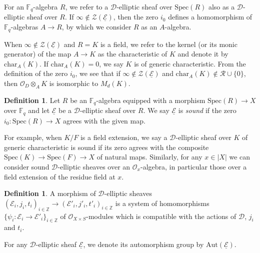 \documentclass[10pt]{amsart}
\theoremstyle{plain}
\theoremstyle{definition}
\newtheorem{dfn}[thm]{Definition}
\newcommand{\Aut}{\mathrm{Aut}}
\newcommand{\chr}{\mathrm{char}}
\newcommand{\Spec}{\mathrm{Spec}}
\newcommand{\cE}{\mathcal{E}}
\newcommand{\cO}{\mathcal{O}}
\newcommand{\cR}{\mathcal{R}}
\newcommand{\cZ}{\mathcal{Z}}
\newcommand{\ucE}{\underline{\mathcal{E}}}
\newcommand{\bF}{\mathbb{F}}
\newcommand{\bZ}{\mathbb{Z}}
\newcommand{\sD}{\mathscr{D}}
\begin{document}
For an $\bF_q$-algebra $R$, we refer to a $\sD$-elliptic sheaf over $\Spec(R)$ also as a $\sD$-elliptic sheaf over $R$. 
If $\infty\notin\cZ(\ucE)$, then the zero $i_{0}$ defines a homomorphism of $\bF_q$-algebras $A\to R$, by which we consider $R$ as an $A$-algebra. 


When $\infty\notin\cZ(\ucE)$ and $R=K$ is a field, we refer to the kernel (or its monic generator) of the map $A\to K$ as 
the characteristic of $K$ and denote it by $\chr_A(K)$. 
If $\chr_A(K)=0$, we say $K$ is of generic characteristic.
From the definition of the zero $i_{0}$, we see that if $\infty\notin\cZ(\ucE)$ and $\chr_A(K)\notin \cR\cup \{0\}$, 
then $\cO_D\otimes_A K$ is isomorphic to $M_d(K)$.


\begin{dfn}\label{DefSound}
Let $R$ be an $\bF_q$-algebra equipped with a morphism $\Spec(R)\to X$ over $\bF_q$ and let $\ucE$ be a $\sD$-elliptic sheaf over $R$.
We say $\ucE$ is \textit{sound} if the zero $i_0:\Spec(R)\to X$ agrees with the given map. 
\end{dfn}

For example, when $K/F$ is a field extension,
we say a $\sD$-elliptic sheaf over $K$ of generic characteristic is sound if its zero agrees with the composite $\Spec(K)\to \Spec(F)\to X$ of natural maps.
Similarly, for any $x\in |X|$ we can consider sound $\sD$-elliptic sheaves over an $\cO_x$-algebra, in particular those over a field extension of the residue 
field at 
$x$. 







\begin{dfn}
	A morphism of $\sD$-elliptic sheaves $(\cE_i,j_i,t_i)_{i\in \bZ}\to (\cE'_i,j'_i,t'_i)_{i\in \bZ}$ is 
	a system of homomorphisms 
	$\{\psi_i:\cE_i\to \cE'_{i}\}_{i\in \bZ}$ of $\cO_{X\times S}$-modules which is compatible with the actions of $\sD$, $j_i$ and $t_i$.
\end{dfn}
For any $\sD$-elliptic sheaf $\ucE$, we denote its automorphism group by $\Aut(\ucE)$.
\end{document}
